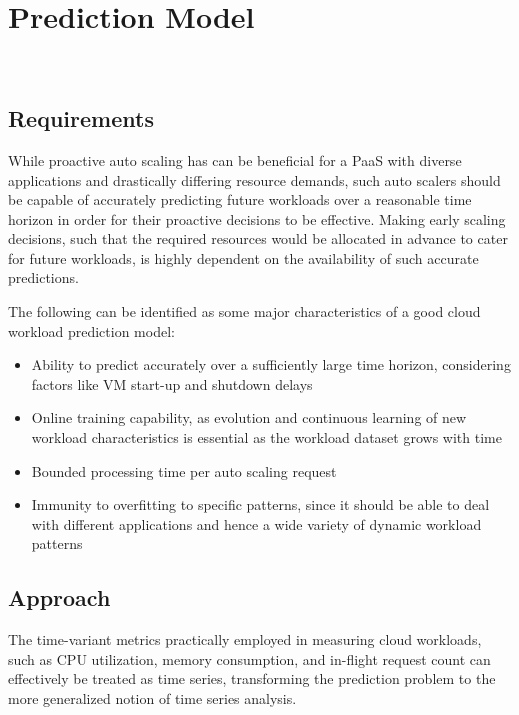 \section{Prediction Model}\\

\subsection{Requirements}
While proactive auto scaling has can be beneficial for a PaaS with diverse applications and drastically differing resource demands, such auto scalers should be capable of accurately predicting future workloads over a reasonable time horizon in order for their proactive decisions to be effective.
Making early scaling decisions, such that the required resources would be allocated in advance to cater for future workloads, is highly dependent on the availability of such accurate predictions.

The following can be identified as some major characteristics of a good cloud workload prediction model:

\begin{itemize}
\item Ability to predict accurately over a sufficiently large time horizon, considering factors like VM start-up and shutdown delays
\item Online training capability, as evolution and continuous learning of new workload characteristics is essential as the workload dataset grows with time
\item Bounded processing time per auto scaling request
\item Immunity to overfitting to specific patterns, since it should be able to deal with different applications and hence a wide variety of dynamic workload patterns
\end{itemize}

\subsection{Approach}
The time-variant metrics practically employed in measuring cloud workloads, such as CPU utilization, memory consumption, and in-flight request count can effectively be treated as time series, transforming the prediction problem to the more generalized notion of time series analysis.

